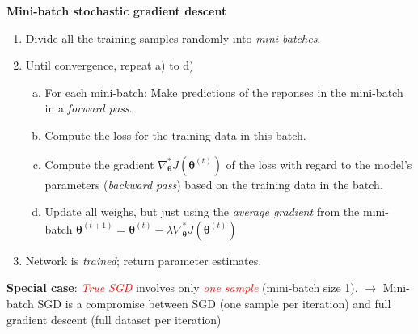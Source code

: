 \documentclass[
  10pt,
  ignorenonframetext,
]{beamer}
\providecommand{\tightlist}{%
  \setlength{\itemsep}{0pt}\setlength{\parskip}{0pt}}
\begin{document}
\begin{frame}
\textbf{Mini-batch stochastic gradient descent}

\vspace{1mm}

\begin{enumerate}
\tightlist
\item
  Divide all the training samples randomly into \emph{mini-batches}.
\end{enumerate}

\vspace{1mm}

\begin{enumerate}
\setcounter{enumi}{1}
\tightlist
\item
  Until convergence, repeat a) to d)

  \begin{enumerate}
  [a)]
  \tightlist
  \item
    For each mini-batch: Make predictions of the reponses in the
    mini-batch in a \emph{forward pass}.
  \item
    Compute the loss for the training data in this batch.
  \item
    Compute the gradient
    \(\nabla_{\boldsymbol \theta}^* J({\boldsymbol \theta}^{(t)})\) of
    the loss with regard to the model's parameters (\emph{backward
    pass}) based on the training data in the batch.
  \item
    Update all weighs, but just using the \emph{average gradient} from
    the mini-batch
    \({\boldsymbol \theta}^{(t+1)}={\boldsymbol \theta}^{(t)} - \lambda \nabla_{\boldsymbol \theta} ^* J({\boldsymbol \theta}^{(t)})\)
  \end{enumerate}
\end{enumerate}

\vspace{1mm}

\begin{enumerate}
\setcounter{enumi}{2}
\tightlist
\item
  Network is \emph{trained}; return parameter estimates.
\end{enumerate}

\vspace{6mm}

\textbf{Special case}: \emph{\textcolor{red}{True SGD}} involves only
\emph{\textcolor{red}{one sample}} (mini-batch size 1). \(\rightarrow\)
Mini-batch SGD is a compromise between SGD (one sample per iteration)
and full gradient descent (full dataset per iteration)
\end{frame}
\end{document}
